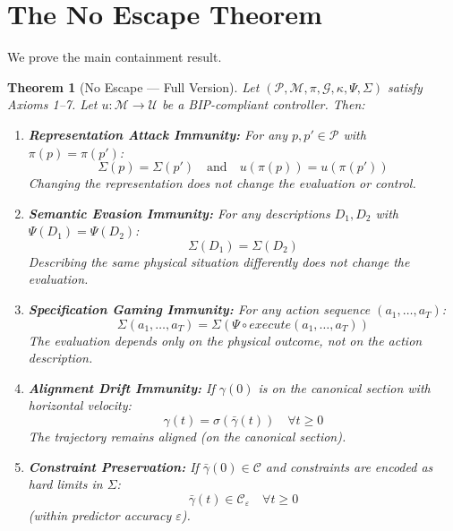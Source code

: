 \documentclass[11pt]{article}
\newtheorem{theorem}{Theorem}[section]
\begin{document}
\section{The No Escape Theorem}

We prove the main containment result.

\begin{theorem}[No Escape --- Full Version]
\label{thm:noescape}
Let $(\mathcal{P}, \mathcal{M}, \pi, \mathcal{G}, \kappa, \Psi, \Sigma)$ satisfy Axioms 1--7. Let
$u : \mathcal{M} \to \mathcal{U}$ be a BIP-compliant controller. Then:
\begin{enumerate}
    \item[(a)] \textbf{Representation Attack Immunity:} For any $p, p' \in \mathcal{P}$ with $\pi(p) = \pi(p')$:
    \[
    \Sigma(p) = \Sigma(p') \quad \text{and} \quad u(\pi(p)) = u(\pi(p'))
    \]
    Changing the representation does not change the evaluation or control.

    \item[(b)] \textbf{Semantic Evasion Immunity:} For any descriptions $D_1, D_2$ with $\Psi(D_1) = \Psi(D_2)$:
    \[
    \Sigma(D_1) = \Sigma(D_2)
    \]
    Describing the same physical situation differently does not change the evaluation.

    \item[(c)] \textbf{Specification Gaming Immunity:} For any action sequence $(a_1, \ldots, a_T)$:
    \[
    \Sigma(a_1, \ldots, a_T) = \Sigma(\Psi \circ \mathit{execute}(a_1, \ldots, a_T))
    \]
    The evaluation depends only on the physical outcome, not on the action description.

    \item[(d)] \textbf{Alignment Drift Immunity:} If $\gamma(0)$ is on the canonical section with horizontal velocity:
    \[
    \gamma(t) = \sigma(\bar{\gamma}(t)) \quad \forall t \geq 0
    \]
    The trajectory remains aligned (on the canonical section).

    \item[(e)] \textbf{Constraint Preservation:} If $\bar{\gamma}(0) \in \mathcal{C}$ and constraints are encoded as hard limits in $\Sigma$:
    \[
    \bar{\gamma}(t) \in \mathcal{C}_\varepsilon \quad \forall t \geq 0
    \]
    (within predictor accuracy $\varepsilon$).
\end{enumerate}
\end{theorem}
\end{document}
